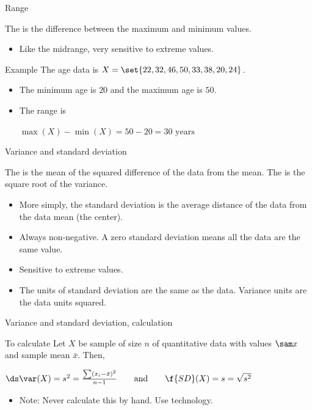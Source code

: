 \documentclass[xcolor=table, handout]{beamer}
\begin{document}
\begin{frame}{Range}
\begin{block}{}
\large
The  is the difference between the maximum and minimum values.
\begin{itemize}
\item Like the midrange, very sensitive to extreme values.
\end{itemize}
\end{block}

\pause
\begin{exampleblock}{Example}
The age data is $X = \set{22, 32, 46, 50, 33, 38, 20, 24}$.
\begin{itemize}
\item The minimum age is $20$ and the maximum age is $50$.
\pause
\item The range is \\
\smallskip
{\centering
$\max(X) - \min(X) = 50 - 20 = 30 \text{ years}$
\par}
\end{itemize}
\smallskip
\end{exampleblock}

\end{frame}

\begin{frame}{Variance and standard deviation}
\begin{block}{}
\large
The  is the mean of the squared difference of the data from the mean. The  is the square root of the variance.
\begin{itemize}
\pause\item More simply, the standard deviation is the average distance of the data from the data mean (the center).
\pause\item Always non-negative. A zero standard deviation means all the data are the same value.
\pause\item Sensitive to extreme values.
\pause\item The units of standard deviation are the same as the data. Variance units are the data units squared.
\end{itemize}
\end{block}
\end{frame}

\begin{frame}{Variance and standard deviation, calculation}
\begin{block}{To calculate}
Let $X$ be sample of size $n$ of quantitative data with values $\sam x$ and sample mean $\bar x$. Then,\\
\smallskip
{\centering
$\ds \var(X) = s^2 = \frac{\sum (x_i - \bar x)^2}{n-1} \qquad \text{and} \qquad  \f{SD}(X) = s = \sqrt{s^2}$
\par}
\begin{itemize}
\pause\item Note: Never calculate this by hand. Use technology.
\end{itemize}
\end{block}
\end{frame}
\end{document}
